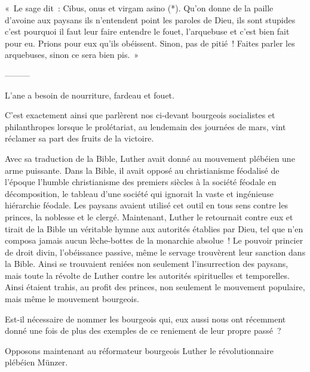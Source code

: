\documentclass[french,twoside]{book} %
\newenvironment{quoteblock}%
  {\begin{quoting}}
  {\end{quoting}}
\newenvironment{quotebar}{%
    \def\FrameCommand{{\color{rubric!10!}\vrule width 0.5em} \hspace{0.9em}}%
    \def\OuterFrameSep{\itemsep} %
    \MakeFramed {\advance\hsize-\width \FrameRestore}
  }%
  {%
    \endMakeFramed
  }
\renewenvironment{quoteblock}%
  {%
    \savenotes
    \setstretch{0.9}
    \normalfont
    \begin{quotebar}
  }
  {%
    \end{quotebar}
    \spewnotes
  }
\begin{document}
\begin{quoteblock}
 \noindent « Le sage dit : Cibus, onus et virgam asino (*). Qu’on donne de la paille d’avoine aux paysans ils n’entendent point les paroles de Dieu, ils sont stupides c’est pourquoi il faut leur faire entendre le fouet, l’arquebuse et c’est bien fait pour eu. Prions pour eux qu’ils obéissent. Sinon, pas de pitié ! Faites parler les arquebuses, sinon ce sera bien pis. »
\end{quoteblock}

———\par
\noindent L’ane a besoin de nourriture, fardeau et fouet.\par
C’est exactement ainsi que parlèrent nos ci-devant bourgeois socialistes et philanthropes lorsque le prolétariat, au lendemain des journées de mars, vint réclamer sa part des fruits de la victoire.\par
Avec sa traduction de la Bible, Luther avait donné au mouvement plébéien une arme puissante. Dans la Bible, il avait opposé au christianisme féodalisé de l’époque l’humble christianisme des premiers siècles à la société féodale en décomposition, le tableau d’une société qui ignorait la vaste et ingénieuse hiérarchie féodale. Les paysans avaient utilisé cet outil en tous sens contre les princes, la noblesse et le clergé. Maintenant, Luther le retournait contre eux et tirait de la Bible un véritable hymne aux autorités établies par Dieu, tel que n’en composa jamais aucun lèche-bottes de la monarchie absolue ! Le pouvoir princier de droit divin, l’obéissance passive, même le servage trouvèrent leur sanction dans la Bible. Ainsi se trouvaient reniées non seulement l’insurrection des paysans, mais toute la révolte de Luther contre les autorités spirituelles et temporelles. Ainsi étaient trahis, au profit des princes, non seulement le mouvement populaire, mais même le mouvement bourgeois.\par
Est-il nécessaire de nommer les bourgeois qui, eux aussi nous ont récemment donné une fois de plus des exemples de ce reniement de leur propre passé ?\par
Opposons maintenant au réformateur bourgeois Luther le révolutionnaire plébéien Münzer.\par
\end{document}

